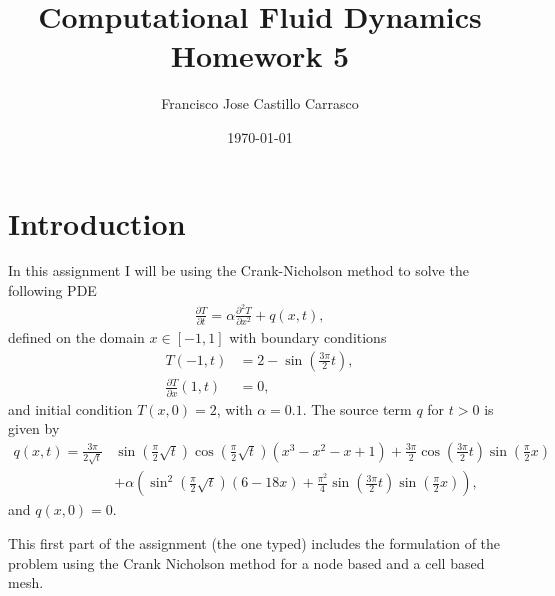 




\title{Computational Fluid Dynamics\\Homework 5}
\author{Francisco Jose Castillo Carrasco}
\date{\today}
\maketitle



\section*{Introduction}
In this assignment I will be using the Crank-Nicholson method to solve the following PDE
\begin{align*}
\frac{\partial T}{\partial t}=\alpha\frac{\partial^2 T}{\partial x^2}+q(x,t),
\end{align*}
defined on the domain $x\in[-1,1]$ with boundary conditions 
\begin{align*}
T(-1,t)&=2-\sin\left(\frac{3\pi}{2}t\right),\\
\frac{\partial T}{\partial x}(1,t)&=0,
\end{align*}
and initial condition $T(x,0)=2$, with $\alpha=0.1$. The source term $q$ for $t>0$ is given by
\begin{align*}
q(x,t)=\frac{3\pi}{2\sqrt{t}}&\sin\left(\frac{\pi}{2}\sqrt{t}\right)\cos\left(\frac{\pi}{2}\sqrt{t}\right)\left(x^3-x^2-x+1\right)+\frac{3\pi}{2}\cos\left(\frac{3\pi}{2}t\right)\sin\left(\frac{\pi}{2}x\right)\\
&+\alpha\left(\sin^2\left(\frac{\pi}{2}\sqrt{t}\right)(6-18x)+\frac{\pi^2}{4}\sin\left(\frac{3\pi}{2}t\right)\sin\left(\frac{\pi}{2}x\right)\right),
\end{align*}
and $q(x,0)=0$.

This first part of the assignment (the one typed) includes the formulation of the problem using the Crank Nicholson method for a node based and a cell based mesh.
